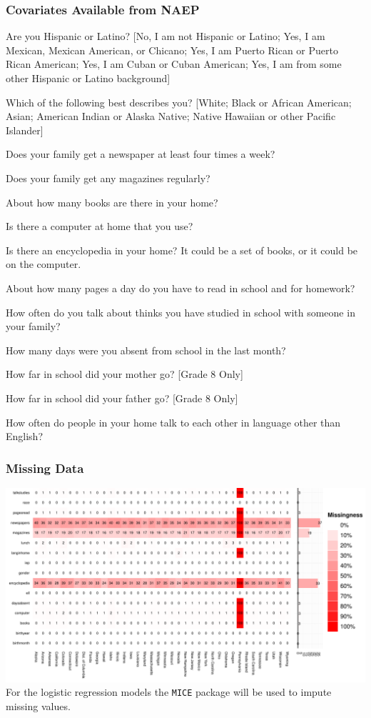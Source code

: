 \documentclass[10pt,slidestop,mathserif]{beamer}
\begin{document}
\begin{frame}
	\frametitle{Covariates Available from NAEP}
	\begin{enumerate}\small{
	\item Are you Hispanic or Latino? [No, I am not Hispanic or Latino; Yes, I am Mexican, Mexican American, or Chicano; Yes, I am Puerto Rican or Puerto Rican American; Yes, I am Cuban or Cuban American; Yes, I am from some other Hispanic or Latino background]
	\item Which of the following best describes you? [White; Black or African American; Asian; American Indian or Alaska Native; Native Hawaiian or other Pacific Islander]
	\item Does your family get a newspaper at least four times a week?
	\item Does your family get any magazines regularly?
	\item About how many books are there in your home?
	\item Is there a computer at home that you use?
	\item Is there an encyclopedia in your home? It could be a set of books, or it could be on the computer.
	\item About how many pages a day do you have to read in school and for homework?
	\item How often do you talk about thinks you have studied in school with someone in your family?
	\item How many days were you absent from school in the last month?
	\item How far in school did your mother go? [Grade 8 Only]
	\item How far in school did your father go? [Grade 8 Only]
	\item How often do people in your home talk to each other in language other than English?
	}
\end{enumerate}
\end{frame}

\begin{frame}[c]
	\frametitle{Missing Data}
	\includegraphics[width=.95\paperwidth]{../Figures/g4mathmissing.pdf} \\
	For the logistic regression models the \texttt{MICE} \cite{Vanbuuren} package will be used to impute missing values.
\end{frame}
\end{document}
